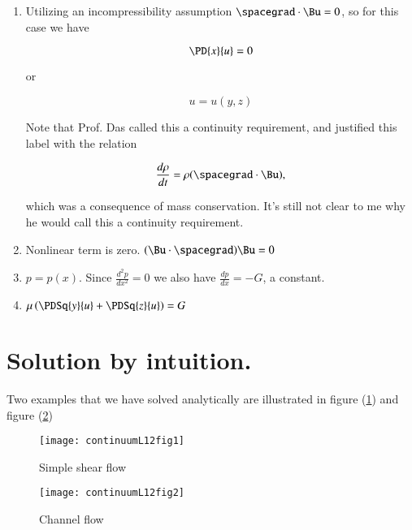 \begin{enumerate}
\item
Utilizing an incompressibility assumption $\spacegrad \cdot \Bu = 0$, so for this case we have

\begin{equation*}
\PD{x}{u} = 0
\end{equation*}

or

\begin{equation*}
u = u(y, z)
\end{equation*}

Note that Prof. Das called this a continuity requirement, and justified this label with the relation

\begin{equation}\label{eqn:classicalMechanicsPs2:550}
\frac{d\rho}{dt} = \rho (\spacegrad \cdot \Bu),
\end{equation}

which was a consequence of mass conservation.  It's still not clear to me why he would call this a continuity requirement.

\item Nonlinear term is zero.  $(\Bu \cdot \spacegrad) \Bu = 0$
\item $p = p(x)$.  Since $\frac{d^2 p}{dx^2} = 0$ we also have $\frac{dp}{dx} = -G$, a constant.

\item $\mu \left( \PDSq{y}{u} + \PDSq{z}{u} \right) = G$

\end{enumerate}

\section{Solution by intuition.}

Two examples that we have solved analytically are illustrated in figure (\ref{fig:continuumL12:continuumL12fig1}) and figure (\ref{fig:continuumL12:continuumL12fig2})

\begin{figure}[htp]
   \centering
   \texttt{[image: continuumL12fig1]}
   \caption{Simple shear flow}\label{fig:continuumL12:continuumL12fig1}
\end{figure}
\begin{figure}[htp]
   \centering
   \texttt{[image: continuumL12fig2]}
   \caption{Channel flow}\label{fig:continuumL12:continuumL12fig2}
\end{figure}

